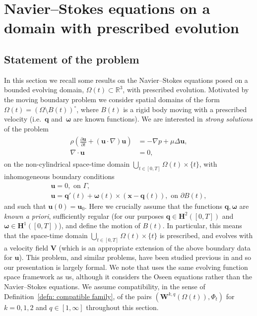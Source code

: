 \documentclass[a4paper]{amsart}
\numberwithin{equation}{section}
\newcommand{\ddt}[1]{\frac{\partial #1}{\partial t}}
\newcommand{\grad}{\nabla}
\newcommand{\Div}{\nabla \cdot}
\theoremstyle{plain}
\newcommand{\mbf}[1]{\mathbf{#1}}
\newcommand{\mbb}[1]{\mathbb{#1}}
\begin{document}
\section{Navier--Stokes equations on a domain with prescribed evolution}
\label{section: evolving NS}
\subsection{Statement of the problem}
In this section we recall some results on the Navier--Stokes equations posed on a bounded evolving domain, $\Omega(t) \subset \mbb{R}^3$, with prescribed evolution.
Motivated by the moving boundary problem we consider spatial domains of the form $\Omega(t) = (\Omega \setminus B(t))^\circ$, where $B(t)$ is a rigid body moving with a prescribed velocity (i.e.~$\mbf{q}$ and~$\boldsymbol{\omega}$ are known functions).
We are interested in \emph{strong solutions} of the problem
\begin{align}
	\begin{split}
		\rho \left( \ddt{\mbf{u}} + (\mbf{u} \cdot \grad) \mbf{u} \right) &= - \grad p + \mu \Delta \mbf{u},\\
		\Div \mbf{u} &= 0,
	\end{split}
	\label{eqn: evolving NS}
\end{align}
on the non-cylindrical space-time domain $\bigcup_{t \in [0,T]} \Omega(t) \times \{ t \}$, with inhomogeneous boundary conditions
\begin{gather*}
	\mbf{u} = 0, \text{ on } \Gamma,\\
	\mbf{u} = \mbf{q}'(t) + \boldsymbol{\omega}(t) \times (\mbf{x} - \mbf{q}(t)), \text{ on } \partial B(t), 
\end{gather*}
and such that $\mbf{u}(0) = \mbf{u}_0$.
Here we crucially assume that the functions $\mbf{q}, \boldsymbol{\omega}$ are \emph{known a priori}, sufficiently regular (for our purposes $\mbf{q} \in \mbf{H}^2([0,T])$ and $\boldsymbol{\omega} \in \mbf{H}^1([0,T])$), and define the motion of $B(t)$.
In particular, this means that the space-time domain $\bigcup_{t \in [0,T]} \Omega(t) \times \{ t \}$ is prescribed, and evolves with a velocity field $\mbf{V}$ (which is an appropriate extension of the above boundary data for $\mbf{u}$).
This problem, and similar problems, have been studied previous in \cite{Bock77NavierStokes,djurdjevac2023evolving,farwig2022fujita,fujita1970existence,ladyzhenskaya1970initial,saal2006maximal,salvi1988navier} and so our presentation is largely formal.
We note that \cite{djurdjevac2023evolving} uses the same evolving function space framework as us, although it considers the Oseen equations rather than the Navier--Stokes equations.
We assume compatibility, in the sense of Definition~\ref{defn: compatible family}, of the pairs $(\mbf{W}^{k,q}(\Omega(t)), \Phi_t)$ for $k=0,1,2$ and $q \in [1,\infty]$ throughout this section.
\end{document}
